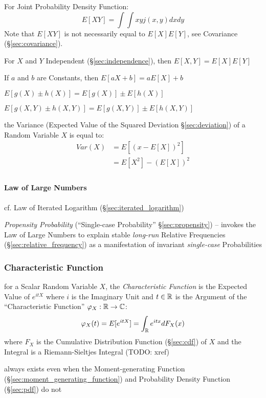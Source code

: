 For Joint Probability Density Function:
\[
  E[X Y] = \int\int x y j(x,y) dx dy
\]
\fist Note that $E[X Y]$ is not necessarily equal to $E[X]
E[Y]$, see Covariance (\S\ref{sec:covariance}).

For $X$ and $Y$ Independent (\S\ref{sec:independence}), then $E[X,Y] = E[X]
E[Y]$

If $a$ and $b$ are Constants, then $E[aX +b] = a E[X] + b$

$E [g(X) \pm h(X)] = E[g(X)] \pm E[h(X)]$

$E [g(X,Y) \pm h(X,Y)] = E[g(X,Y)] \pm E[h(X,Y)]$

the Variance (Expected Value of the Squared Deviation \S\ref{sec:deviation}) of
a Random Variable $X$ is equal to:
\begin{align*}
  Var(X) & = E[(x - E[X])^2] \\
         & = E[X^2] - (E[X])^2 \\
\end{align*}



\paragraph{Law of Large Numbers}\label{sec:large_numbers}\hfill

\fist cf. Law of Iterated Logarithm (\S\ref{sec:iterated_logarithm})

\fist \emph{Propensity Probability} (``Single-case Probability''
\S\ref{sec:propensity}) -- invokes the Law of Large Numbers to explain stable
\emph{long-run} Relative Frequencies (\S\ref{sec:relative_frequency}) as a
manifestation of invariant \emph{single-case} Probabilities



\subsubsection{Characteristic Function}\label{sec:characteristic_function}

for a Scalar Random Variable $X$, the \emph{Characteristic Function} is the
Expected Value of $e^{itX}$ where $i$ is the Imaginary Unit and $t \in \mathbb{R}$
is the Argument of the ``Characteristic Function'' $\varphi_X : \mathbb{R}
\rightarrow \mathbb{C}$:
\[
  \varphi_X(t) = E[e^{itX}] = \int_{\mathbb{R}} e^{itx} dF_X(x)
\]
where $F_X$ is the Cumulative Distribution Function (\S\ref{sec:cdf}) of $X$ and
the Integral is a Riemann-Sieltjes Integral (TODO: xref)

always exists even when the Moment-generating Function
(\S\ref{sec:moment_generating_function}) and Probability Density Function
(\S\ref{sec:pdf}) do not

